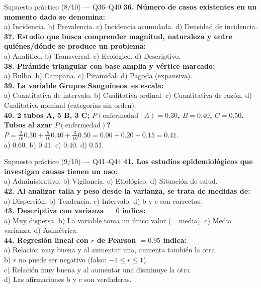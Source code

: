 \documentclass[aspectratio=169,8pt]{beamer}
\begin{document}
\begin{frame}{Supuesto pr\'actico (8/10) --- Q36--Q40}
  \scriptsize
  \textbf{36. N\'umero de casos existentes en un momento dado se denomina:}\\
  a) Incidencia.\; b) Prevalencia.\; c) Incidencia acumulada.\; d) Densidad de incidencia.\\[3pt]
  \textbf{37. Estudio que busca comprender magnitud, naturaleza y entre qui\'enes/d\'onde se produce un problema:}\\
  a) Anal\'itico.\; b) Transversal.\; c) Ecol\'ogico.\; d) Descriptivo.\\[3pt]
  \textbf{38. Pir\'amide triangular con base amplia y v\'ertice marcado:}\\
  a) Bulbo.\; b) Campana.\; c) Piramidal.\; d) Pagoda (expansiva).\\[3pt]
  \textbf{39. La variable \guillemotleft Grupos Sangu\'ineos\guillemotright\ es escala:}\\
  a) Cuantitativa de intervalo.\; b) Cualitativa ordinal.\; c) Cuantitativa de raz\'on.\; d) Cualitativa nominal (categor\'ias sin orden).\\[3pt]
  \textbf{40. 2 tubos A, 5 B, 3 C; $P(\text{enfermedad}\mid A)=0.30$, $B=0.40$, $C=0.50$. Tubos al azar \textquestiondown{}$P(\text{enfermedad})$?}\\
  $P = \tfrac{2}{10}0.30+\tfrac{5}{10}0.40+\tfrac{3}{10}0.50=0.06+0.20+0.15=0.41$.\\
  a) 0.60.\; b) 0.41.\; c) 0.40.\; d) 0.51.
\end{frame}

\begin{frame}{Supuesto pr\'actico (9/10) --- Q41--Q44}
  \scriptsize
  \textbf{41. Los estudios epidemiol\'ogicos que investigan causas tienen un uso:}\\
  a) Administrativo.\; b) Vigilancia.\; c) Etiol\'ogico.\; d) Situaci\'on de salud.\\[3pt]
  \textbf{42. Al analizar talla y peso desde la varianza, se trata de medidas de:}\\
  a) Dispersi\'on.\; b) Tendencia.\; c) Intervalo.\; d) b y c son correctas.\\[3pt]
  \textbf{43. Descriptiva con varianza $=0$ indica:}\\
  a) Muy dispersa.\; b) La variable toma un \'unico valor (= media).\;
  c) Media = varianza.\; d) Asim\'etrica.\\[3pt]
  \textbf{44. Regresi\'on lineal con $r$ de Pearson $=0.95$ indica:}\\
  a) Relaci\'on muy buena y al aumentar una, aumenta tambi\'en la otra.\\
  b) $r$ no puede ser negativo (falso: $-1\le r\le1$).\\
  c) Relaci\'on muy buena y al aumentar una disminuye la otra.\\
  d) Las afirmaciones b y c son verdaderas.
\end{frame}
\end{document}
